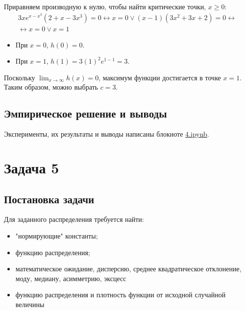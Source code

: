 \documentclass[a4paper,14pt]{extarticle}
\begin{document}
                    Приравняем производную к нулю, чтобы найти критические точки, $x \geq 0$:
                    \begin {gather*}
                            3x e^{x - x^3} (2 + x - 3x^3) = 0 \leftrightarrow
                            x = 0 \lor (x-1)(3x^2 + 3x + 2) = 0 \leftrightarrow \\
                            \leftrightarrow x = 0 \lor x = 1
                    \end{gather*}
                    
                    \begin{itemize}
                            \item При $x=0$, $h(0) = 0$.
                            \item При $x=1$, $h(1) = 3(1)^2 e^{1-1} = 3$.
                    \end{itemize}
                    
                    Поскольку $\lim_{x \to \infty} h(x) = 0$, максимум функции достигается в точке $x=1$.
                    Таким образом, можно выбрать $c = 3$.
        
        \subsection*{Эмпирическое решение и выводы}
            Эксперименты, их результаты и выводы написаны блокноте \href{https://github.com/vorandpav/TVIPS}{4.ipynb}.
            
    
    
    \section*{Задача 5}
        
        \subsection*{Постановка задачи}
            
            Для заданного распределения требуется найти:
            \begin{itemize}
                \item "нормирующие" константы;
                \item функцию распределения;
                \item математическое ожидание, дисперсию, среднее квадратическое отклонение, моду, медиану, асимметрию, эксцесс
                \item функцию распределения и плотность функции от исходной случайной величины
            \end{itemize}
        
\end{document}
